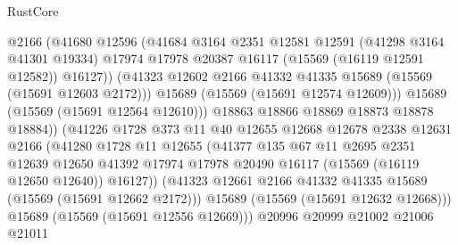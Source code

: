 \begin{lexlean}{RustCore}
\begin{coremodule}
                            @2166
                            (@41680
                              @12596
                              (@41684
                                @3164
                                @2351
                                @12581
                                @12591
                                (@41298 @3164 @41301 @19334)
                                @17974
                                @17978
                                @20387
                                @16117
                                (@15569 (@16119 @12591 @12582))
                                @16127))
                            (@41323
                              @12602
                              @2166
                              @41332
                              @41335
                              @15689
                              (@15569 (@15691 @12603 @2172)))
                            @15689
                            (@15569 (@15691 @12574 @12609)))
                          @15689
                          (@15569 (@15691 @12564 @12610)))
                        @18863
                        @18866
                        @18869
                        @18873
                        @18878
                        @18884))
                    (@41226
                      @1728
                      @373
                      @11
                      @40
                      @12655
                      @12668
                      @12678
                      @2338
                      @12631
                      @2166
                      (@41280
                        @1728
                        @11
                        @12655
                        (@41377
                          @135
                          @67
                          @11
                          @2695
                          @2351
                          @12639
                          @12650
                          @41392
                          @17974
                          @17978
                          @20490
                          @16117
                          (@15569 (@16119 @12650 @12640))
                          @16127))
                      (@41323 @12661 @2166 @41332 @41335 @15689 (@15569 (@15691 @12662 @2172)))
                      @15689
                      (@15569 (@15691 @12632 @12668)))
                    @15689
                    (@15569 (@15691 @12556 @12669)))
                  @20996
                  @20999
                  @21002
                  @21006
                  @21011

\end{coremodule}
\end{lexlean}
